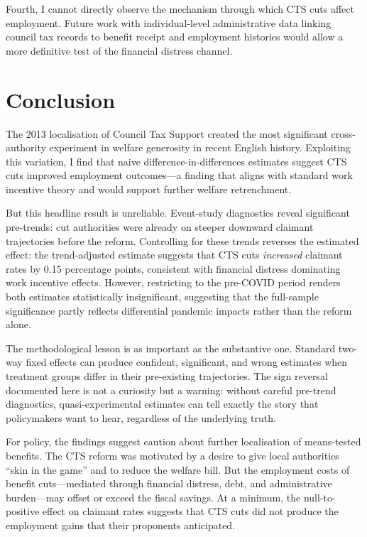 \documentclass[12pt]{article}
\begin{document}
Fourth, I cannot directly observe the mechanism through which CTS cuts affect employment. Future work with individual-level administrative data linking council tax records to benefit receipt and employment histories would allow a more definitive test of the financial distress channel.



\section{Conclusion}

The 2013 localisation of Council Tax Support created the most significant cross-authority experiment in welfare generosity in recent English history. Exploiting this variation, I find that naive difference-in-differences estimates suggest CTS cuts improved employment outcomes---a finding that aligns with standard work incentive theory and would support further welfare retrenchment.

But this headline result is unreliable. Event-study diagnostics reveal significant pre-trends: cut authorities were already on steeper downward claimant trajectories before the reform. Controlling for these trends reverses the estimated effect: the trend-adjusted estimate suggests that CTS cuts \emph{increased} claimant rates by 0.15 percentage points, consistent with financial distress dominating work incentive effects. However, restricting to the pre-COVID period renders both estimates statistically insignificant, suggesting that the full-sample significance partly reflects differential pandemic impacts rather than the reform alone.

The methodological lesson is as important as the substantive one. Standard two-way fixed effects can produce confident, significant, and wrong estimates when treatment groups differ in their pre-existing trajectories. The sign reversal documented here is not a curiosity but a warning: without careful pre-trend diagnostics, quasi-experimental estimates can tell exactly the story that policymakers want to hear, regardless of the underlying truth.

For policy, the findings suggest caution about further localisation of means-tested benefits. The CTS reform was motivated by a desire to give local authorities ``skin in the game'' and to reduce the welfare bill. But the employment costs of benefit cuts---mediated through financial distress, debt, and administrative burden---may offset or exceed the fiscal savings. At a minimum, the null-to-positive effect on claimant rates suggests that CTS cuts did not produce the employment gains that their proponents anticipated.
\end{document}
